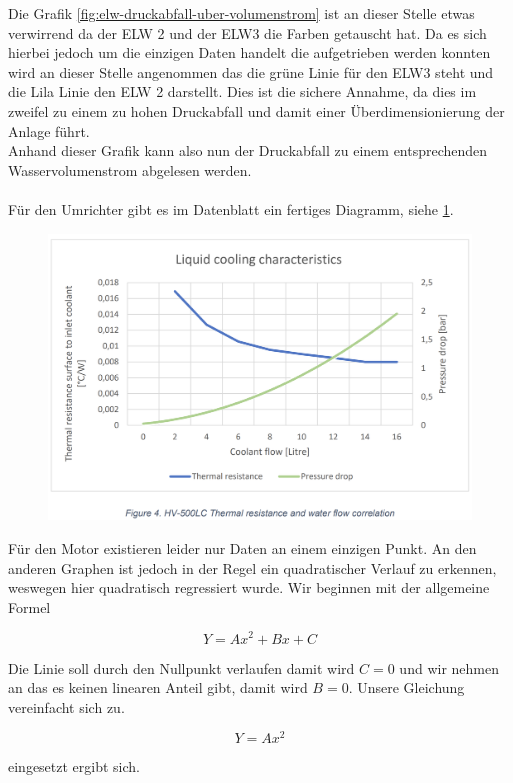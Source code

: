 Die Grafik \ref{fig:elw-druckabfall-uber-volumenstrom} ist an dieser Stelle etwas verwirrend da der ELW 2 und der ELW3 die Farben getauscht hat. Da es sich hierbei jedoch um die einzigen Daten handelt die aufgetrieben werden konnten wird an dieser Stelle angenommen das die grüne Linie für den ELW3 steht und die Lila Linie den ELW 2 darstellt. Dies ist die sichere Annahme, da dies im zweifel zu einem zu hohen Druckabfall und damit einer Überdimensionierung der Anlage führt.\\
Anhand dieser Grafik kann also nun der Druckabfall zu einem entsprechenden Wasservolumenstrom abgelesen werden.\\
\\
Für den Umrichter gibt es im Datenblatt ein fertiges Diagramm, siehe \ref{fig:cooling-characteristik}.
\begin{figure}[h]
	\centering
	\includegraphics[width=0.7\linewidth]{"bilder/Druckabfall DTI500LC"}
	\caption{}
	\label{fig:cooling-characteristik}
\end{figure}

Für den Motor existieren leider nur Daten an einem einzigen Punkt. An den anderen Graphen ist jedoch in der Regel ein quadratischer Verlauf zu erkennen, weswegen hier quadratisch regressiert wurde. Wir beginnen mit der allgemeine Formel

\begin{equation}
	Y = A x^2 + B x + C
\end{equation}

Die Linie soll durch den Nullpunkt verlaufen damit wird \ensuremath{C = 0} und wir nehmen an das es keinen linearen Anteil gibt, damit wird \ensuremath{B = 0}. Unsere Gleichung vereinfacht sich zu.

\begin{equation}
	Y = A x^2
\end{equation}

eingesetzt ergibt sich.

